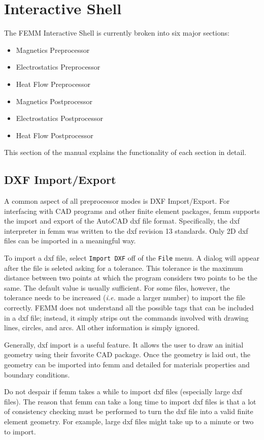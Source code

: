 \documentclass[12pt]{report}
\begin{document}
\chapter{Interactive Shell}

The FEMM Interactive Shell is currently broken into six major
sections:
\begin{itemize}
\item Magnetics Preprocessor
\item Electrostatics Preprocessor
\item Heat Flow Preprocessor
\item Magnetics Postprocessor
\item Electrostatics Postprocessor
\item Heat Flow Postprocessor
\end{itemize}
This section of the manual explains the functionality of each
section in detail.

\section{DXF Import/Export}

A common aspect of all preprocessor modes is DXF Import/Export. For
interfacing with CAD programs and other finite element packages,
femm supports the import and export of the AutoCAD dxf file format.
Specifically, the dxf interpreter in femm was written to the dxf
revision 13 standards. Only 2D dxf files can be imported in a
meaningful way.

To import a dxf file, select \texttt{Import DXF} off of the
\texttt{File} menu. A dialog will appear after the file is seleted
asking for a tolerance. This tolerance is the maximum distance
between two points at which the program considers two points to be
the same. The default value is usually sufficient. For some files,
however, the tolerance needs to be increased ({\em i.e.} made a
larger number) to import the file correctly. FEMM does not
understand all the possible tags that can be included in a dxf
file; instead, it simply strips out the commands involved with
drawing lines, circles, and arcs. All other information is simply
ignored.

Generally, dxf import is a useful feature. It allows the user to
draw an initial geometry using their favorite CAD package. Once the
geometry is laid out, the geometry can be imported into femm and
detailed for materials properties and boundary conditions.

Do not despair if femm takes a while to import dxf files
(especially large dxf files). The reason that femm can take a long
time to import dxf files is that a lot of consistency checking must
be performed to turn the dxf file into a valid finite element
geometry. For example, large dxf files might take up to a minute or
two to import.
\end{document}
